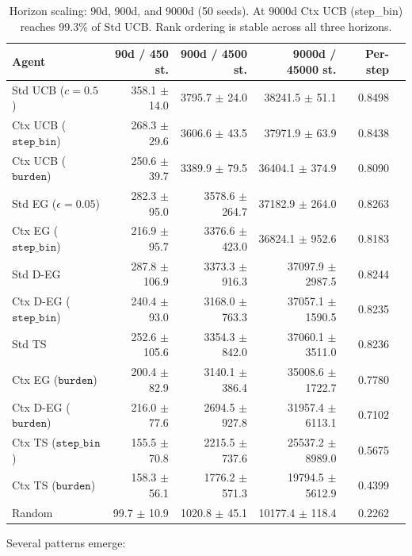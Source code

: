 \documentclass[11pt]{article}
\begin{document}
\begin{table}[h]
\centering
\begin{tabular}{lrrrrr}
\toprule
Agent & 90d / 450 st. & 900d / 4500 st. & 9000d / 45000 st. & Per-step \\
\midrule
Std UCB ($c=0.5$) & 358.1 $\pm$ 14.0 & 3795.7 $\pm$ 24.0 & 38241.5 $\pm$ 51.1 & 0.8498 \\
Ctx UCB ($\texttt{step\_bin}$) & 268.3 $\pm$ 29.6 & 3606.6 $\pm$ 43.5 & 37971.9 $\pm$ 63.9 & 0.8438 \\
Ctx UCB ($\texttt{burden}$) & 250.6 $\pm$ 39.7 & 3389.9 $\pm$ 79.5 & 36404.1 $\pm$ 374.9 & 0.8090 \\
Std EG ($\epsilon=0.05$) & 282.3 $\pm$ 95.0 & 3578.6 $\pm$ 264.7 & 37182.9 $\pm$ 264.0 & 0.8263 \\
Ctx EG ($\texttt{step\_bin}$) & 216.9 $\pm$ 95.7 & 3376.6 $\pm$ 423.0 & 36824.1 $\pm$ 952.6 & 0.8183 \\
Std D-EG & 287.8 $\pm$ 106.9 & 3373.3 $\pm$ 916.3 & 37097.9 $\pm$ 2987.5 & 0.8244 \\
Ctx D-EG ($\texttt{step\_bin}$) & 240.4 $\pm$ 93.0 & 3168.0 $\pm$ 763.3 & 37057.1 $\pm$ 1590.5 & 0.8235 \\
Std TS & 252.6 $\pm$ 105.6 & 3354.3 $\pm$ 842.0 & 37060.1 $\pm$ 3511.0 & 0.8236 \\
Ctx EG ($\texttt{burden}$) & 200.4 $\pm$ 82.9 & 3140.1 $\pm$ 386.4 & 35008.6 $\pm$ 1722.7 & 0.7780 \\
Ctx D-EG ($\texttt{burden}$) & 216.0 $\pm$ 77.6 & 2694.5 $\pm$ 927.8 & 31957.4 $\pm$ 6113.1 & 0.7102 \\
Ctx TS ($\texttt{step\_bin}$) & 155.5 $\pm$ 70.8 & 2215.5 $\pm$ 737.6 & 25537.2 $\pm$ 8989.0 & 0.5675 \\
Ctx TS ($\texttt{burden}$) & 158.3 $\pm$ 56.1 & 1776.2 $\pm$ 571.3 & 19794.5 $\pm$ 5612.9 & 0.4399 \\
\midrule
Random & 99.7 $\pm$ 10.9 & 1020.8 $\pm$ 45.1 & 10177.4 $\pm$ 118.4 & 0.2262 \\
\bottomrule
\end{tabular}
\caption{Horizon scaling: 90d, 900d, and 9000d (50 seeds). At 9000d Ctx UCB (step\_bin) reaches 99.3\% of Std UCB. Rank ordering is stable across all three horizons.}
\end{table}

Several patterns emerge:
\end{document}

